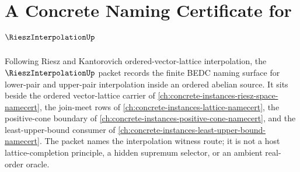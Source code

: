 \chapter{A Concrete Naming Certificate for $\RieszInterpolationUp$}
\label{ch:concrete-instances-riesz-interpolation-namecert}

Following Riesz and Kantorovich ordered-vector-lattice interpolation, the $\RieszInterpolationUp$ packet records the finite BEDC naming surface for lower-pair and upper-pair interpolation inside an ordered abelian source. It sits beside the ordered vector-lattice carrier of \autoref{ch:concrete-instances-riesz-space-namecert}, the join-meet rows of \autoref{ch:concrete-instances-lattice-namecert}, the positive-cone boundary of \autoref{ch:concrete-instances-positive-cone-namecert}, and the least-upper-bound consumer of \autoref{ch:concrete-instances-least-upper-bound-namecert}. The packet names the interpolation witness route; it is not a host lattice-completion principle, a hidden supremum selector, or an ambient real-order oracle.

